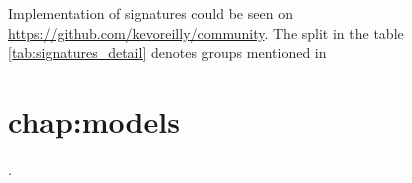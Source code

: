 Implementation of signatures could be seen on \url{https://github.com/kevoreilly/community}. The split in the table \ref{tab:signatures_detail} denotes groups mentioned in \chapter{chap:models}.




